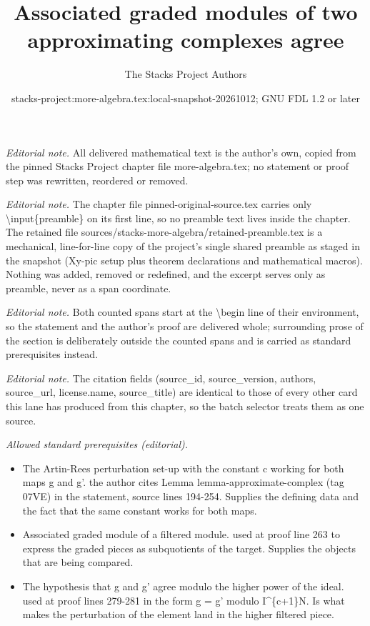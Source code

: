 \documentclass[10pt,a4paper]{amsart}
\title{Associated graded modules of two approximating complexes agree}
\author{The Stacks Project Authors}
\date{stacks-project:more-algebra.tex:local-snapshot-20261012; GNU FDL 1.2 or later}
\theoremstyle{plain}
\theoremstyle{definition}
\theoremstyle{remark}
\numberwithin{equation}{subsection}
\begin{document}
\maketitle
\setcounter{subsection}{1}
\noindent\textit{Editorial note.} All delivered mathematical text is the author's own, copied from the pinned Stacks Project chapter file more-algebra.tex; no statement or proof step was rewritten, reordered or removed.\par\medskip
\noindent\textit{Editorial note.} The chapter file pinned-original-source.tex carries only \textbackslash{}input\{preamble\} on its first line, so no preamble text lives inside the chapter. The retained file sources/stacks-more-algebra/retained-preamble.tex is a mechanical, line-for-line copy of the project's single shared preamble as staged in the snapshot (Xy-pic setup plus theorem declarations and mathematical macros). Nothing was added, removed or redefined, and the excerpt serves only as preamble, never as a span coordinate.\par\medskip
\noindent\textit{Editorial note.} Both counted spans start at the \textbackslash{}begin line of their environment, so the statement and the author's proof are delivered whole; surrounding prose of the section is deliberately outside the counted spans and is carried as standard prerequisites instead.\par\medskip
\noindent\textit{Editorial note.} The citation fields (source\_id, source\_version, authors, source\_url, license.name, source\_title) are identical to those of every other card this lane has produced from this chapter, so the batch selector treats them as one source.\par\medskip
\noindent\textit{Allowed standard prerequisites (editorial).}\begin{itemize}
\item The Artin-Rees perturbation set-up with the constant c working for both maps g and g'. the author cites Lemma lemma-approximate-complex (tag 07VE) in the statement, source lines 194-254. Supplies the defining data and the fact that the same constant works for both maps.
\item Associated graded module of a filtered module. used at proof line 263 to express the graded pieces as subquotients of the target. Supplies the objects that are being compared.
\item The hypothesis that g and g' agree modulo the higher power of the ideal. used at proof lines 279-281 in the form g = g' modulo I\textasciicircum{}\{c+1\}N. Is what makes the perturbation of the element land in the higher filtered piece.
\end{itemize}\medskip
\end{document}
